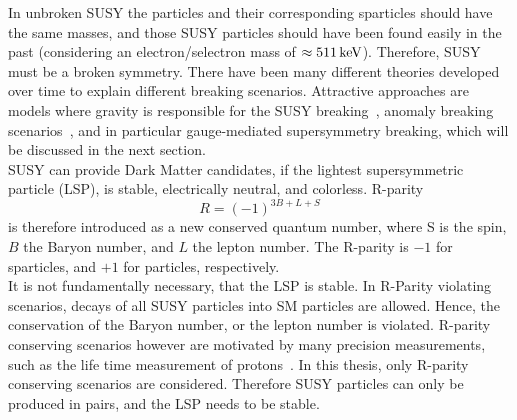 \begin{enumerate}
In unbroken SUSY the particles and their corresponding sparticles should have the same masses, and those SUSY particles should have been found easily in the past (considering \eg an electron/selectron mass of $\approx511\,\text{ke\hspace{-.08em}V}$). Therefore, SUSY must be a broken symmetry. There have been many different theories developed over time to explain different breaking scenarios. Attractive approaches are models where gravity is responsible for the SUSY breaking~\cite{SUSYPrimer}, anomaly breaking scenarios~\cite{AMSB}, and in particular gauge-mediated supersymmetry breaking, which will be discussed in the next section.\\
SUSY can provide Dark Matter candidates, if the lightest supersymmetric particle (LSP), is stable, electrically neutral, and colorless.
R-parity
\begin{equation}
 R = (-1)^{3B+L+S}
\end{equation}
is therefore introduced as a new conserved quantum number, where S is the spin, $B$ the Baryon number, and $L$ the lepton number. The R-parity is $-1$ for sparticles, and $+1$ for particles, respectively.\\
It is not fundamentally necessary, that the LSP is stable. In R-Parity violating scenarios, decays of all SUSY particles into SM particles are allowed. Hence, the conservation of the Baryon number, or the lepton number is violated. R-parity conserving scenarios however are motivated by many precision measurements, such as the life time measurement of protons~\cite{ProtonDecay}.
In this thesis, only R-parity conserving scenarios are considered. Therefore SUSY particles can only be produced in pairs, and the LSP needs to be stable.\\




\end{enumerate}
